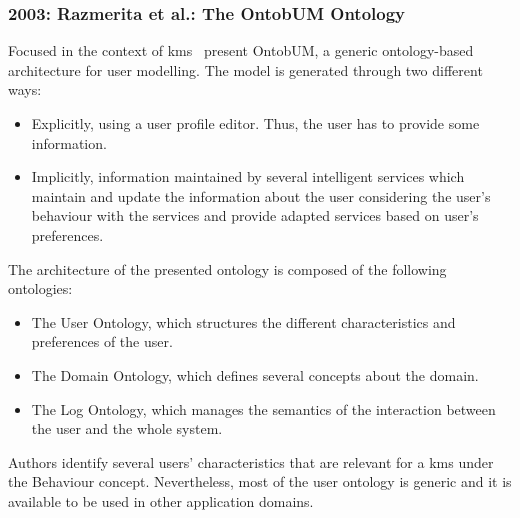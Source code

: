 \subsubsection{2003: Razmerita et al.: The OntobUM Ontology}
\label{sec:razmerita2003ontology}

Focused in the context of \ac{kms}~\citet{razmerita_ontology_based_2003} present
OntobUM, a generic ontology-based architecture for user modelling. The model is 
generated through two different ways:

\begin{itemize}
  \item Explicitly, using a user profile editor. Thus, the user has to 
  provide some information.
  \item Implicitly, information maintained by several intelligent services 
  which maintain and update the information about the user considering the 
  user's behaviour with the services and provide adapted services based on 
  user's preferences.
\end{itemize}

The architecture of the presented ontology is composed of the following ontologies:

\begin{itemize}
  \item The User Ontology, which structures the different characteristics and 
  preferences of the user.
  \item The Domain Ontology, which defines several concepts about the domain.
  \item The Log Ontology, which manages the semantics of the interaction 
  between the user and the whole system.
\end{itemize}

Authors identify several users' characteristics that are relevant for a \ac{kms} 
under the Behaviour concept. Nevertheless, most of the user ontology is 
generic and it is available to be used in other application domains. 


